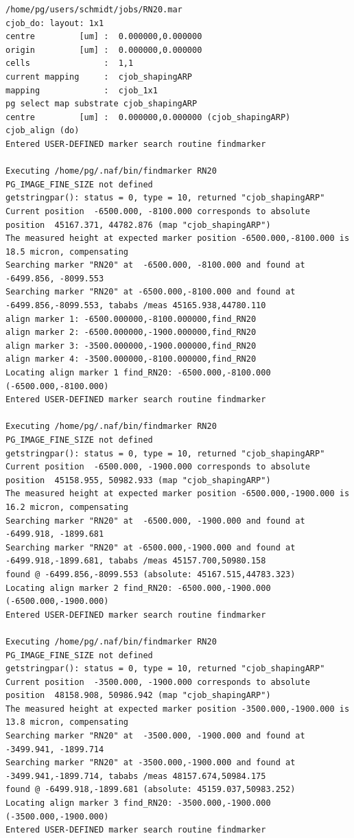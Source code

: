 \begin{itemize}
\begin{lstlisting}
/home/pg/users/schmidt/jobs/RN20.mar
cjob_do: layout: 1x1
centre         [um] :  0.000000,0.000000
origin         [um] :  0.000000,0.000000
cells               :  1,1
current mapping     :  cjob_shapingARP
mapping             :  cjob_1x1
pg select map substrate cjob_shapingARP
centre         [um] :  0.000000,0.000000 (cjob_shapingARP)
cjob_align (do)
Entered USER-DEFINED marker search routine findmarker

Executing /home/pg/.naf/bin/findmarker RN20
PG_IMAGE_FINE_SIZE not defined
getstringpar(): status = 0, type = 10, returned "cjob_shapingARP"
Current position  -6500.000, -8100.000 corresponds to absolute position  45167.371, 44782.876 (map "cjob_shapingARP")
The measured height at expected marker position -6500.000,-8100.000 is 18.5 micron, compensating
Searching marker "RN20" at  -6500.000, -8100.000 and found at  -6499.856, -8099.553
Searching marker "RN20" at -6500.000,-8100.000 and found at -6499.856,-8099.553, tababs /meas 45165.938,44780.110
align marker 1: -6500.000000,-8100.000000,find_RN20
align marker 2: -6500.000000,-1900.000000,find_RN20
align marker 3: -3500.000000,-1900.000000,find_RN20
align marker 4: -3500.000000,-8100.000000,find_RN20
Locating align marker 1 find_RN20: -6500.000,-8100.000  (-6500.000,-8100.000)
Entered USER-DEFINED marker search routine findmarker

Executing /home/pg/.naf/bin/findmarker RN20
PG_IMAGE_FINE_SIZE not defined
getstringpar(): status = 0, type = 10, returned "cjob_shapingARP"
Current position  -6500.000, -1900.000 corresponds to absolute position  45158.955, 50982.933 (map "cjob_shapingARP")
The measured height at expected marker position -6500.000,-1900.000 is 16.2 micron, compensating
Searching marker "RN20" at  -6500.000, -1900.000 and found at  -6499.918, -1899.681
Searching marker "RN20" at -6500.000,-1900.000 and found at -6499.918,-1899.681, tababs /meas 45157.700,50980.158
found @ -6499.856,-8099.553 (absolute: 45167.515,44783.323)
Locating align marker 2 find_RN20: -6500.000,-1900.000  (-6500.000,-1900.000)
Entered USER-DEFINED marker search routine findmarker

Executing /home/pg/.naf/bin/findmarker RN20
PG_IMAGE_FINE_SIZE not defined
getstringpar(): status = 0, type = 10, returned "cjob_shapingARP"
Current position  -3500.000, -1900.000 corresponds to absolute position  48158.908, 50986.942 (map "cjob_shapingARP")
The measured height at expected marker position -3500.000,-1900.000 is 13.8 micron, compensating
Searching marker "RN20" at  -3500.000, -1900.000 and found at  -3499.941, -1899.714
Searching marker "RN20" at -3500.000,-1900.000 and found at -3499.941,-1899.714, tababs /meas 48157.674,50984.175
found @ -6499.918,-1899.681 (absolute: 45159.037,50983.252)
Locating align marker 3 find_RN20: -3500.000,-1900.000  (-3500.000,-1900.000)
Entered USER-DEFINED marker search routine findmarker


\end{lstlisting}
\end{itemize}
